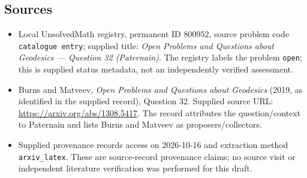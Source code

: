 \documentclass[11pt]{article}
\begin{document}
\subsection{Sources}
\begin{itemize}
\item Local UnsolvedMath registry, permanent ID \(800952\), source problem code \texttt{catalogue entry}; supplied title: \emph{Open Problems and Questions about Geodesics --- Question 32 (Paternain)}. The registry labels the problem \texttt{open}; this is supplied status metadata, not an independently verified assessment.
\item Burns and Matveev, \emph{Open Problems and Questions about Geodesics} (2019, as identified in the supplied record), Question 32. Supplied source URL: \url{https://arxiv.org/abs/1308.5417}. The record attributes the question/context to Paternain and lists Burns and Matveev as proposers/collectors.
\item Supplied provenance records access on 2026-10-16 and extraction method \texttt{arxiv\_latex}. These are source-record provenance claims; no source visit or independent literature verification was performed for this draft.
\end{itemize}
\end{document}
